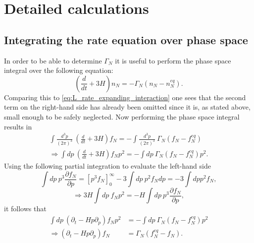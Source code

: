 \chapter{Detailed calculations}
\section{Integrating the rate equation over phase space}
\label{ap:phase_space}
In order to be able to determine $\Gamma_N$ it is useful to perform the phase space integral over the following equation:
\begin{equation*}
\left(\frac{d}{dt}+3H\right)n_N=-\Gamma_N\left(n_N-n_N^{eq}\right).
\end{equation*}
Comparing this to \eqref{eq:L_rate_expanding_interaction} one sees that the second term on the right-hand side has already been omitted since it is, as stated above, small enough to be safely neglected. \newline\indent
Now performing the phase space integral results in
\begin{align*}
\int\frac{d^3p}{\left(2\pi\right)^3}\: \left(\frac{d}{dt}+3H\right)f_N=-\int\frac{d^3p}{\left(2\pi\right)^3}\:\Gamma_N\left(f_N-f_N^{eq}\right)\\
\Rightarrow \int dp\: \left(\frac{d}{dt}+3H\right)f_Np^2=-\int dp\:\Gamma_N\left(f_N-f_N^{eq}\right)p^2.
\end{align*}
Using the following partial integration to evaluate the left-hand side
\begin{equation*}
\int dp\:p^3\frac{\partial f_N}{\partial p}=\left[p^3f_N\right]_0^\infty-3\int dp\:p^2f_Ndp=-3\int dp p^2f_N,
\end{equation*}
\begin{equation*}
\Rightarrow 3H\int dp\: f_Np^2=-H\int dp\: p^3\frac{\partial f_N}{\partial p},
\end{equation*}
it follows that
\begin{align*}
\int  dp\:\left(\partial_t-Hp\partial_p\right)f_Np^2&=-\int dp\:\Gamma_N\left(f_N-f_N^{eq}\right)p^2\\
\Rightarrow \left(\partial_t-Hp\partial_p\right)f_N&=\Gamma_N\left(f_N^{eq}-f_N\right).
\end{align*}

